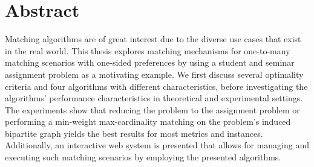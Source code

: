 \section*{Abstract}\label{sec:abstract}

Matching algorithms are of great interest due to the diverse use cases that exist in the real world. This thesis explores matching mechanisms for one-to-many matching scenarios with one-sided preferences by using a student and seminar assignment problem as a motivating example. We first discuss several optimality criteria and four algorithms with different characteristics, before investigating the algorithms' performance characteristics in theoretical and experimental settings. The experiments show that reducing the problem to the assignment problem or performing a min-weight max-cardinality matching on the problem's induced bipartite graph yields the best results for most metrics and instances. Additionally, an interactive web system is presented that allows for managing and executing such matching scenarios by employing the presented algorithms. 